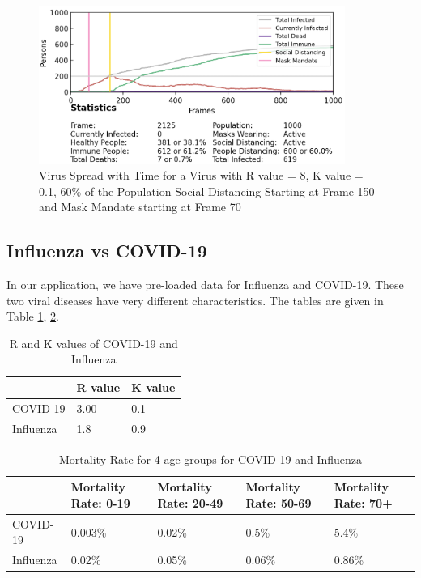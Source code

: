 \documentclass[11pt]{article}
\begin{document}
\begin{figure}[H]
    \centering
    \includegraphics[width=10cm]{figures/outbreak_control.png}
    \caption{Virus Spread with Time for a Virus with R value = 8, K value = 0.1, 60\% of the Population Social Distancing Starting at Frame 150 and Mask Mandate starting at Frame 70}
    \label{outbreak control}
\end{figure}

\subsection{Influenza vs COVID-19}
In our application, we have pre-loaded data for Influenza\cite{influ_ref}\cite{k_val} and COVID-19\cite{cov_ref}\cite{k_val}. These two viral diseases have very different characteristics. The tables are given in Table \ref{analysis-rk}, \ref{analysis-mortality}. 

\begin{table}[H]
\begin{tabular}{|l|l|l|}

\hline
          & R value & K value \\ \hline
COVID-19  & 3.00    & 0.1    \\ \hline
Influenza & 1.8     & 0.9    \\ \hline
\end{tabular}
    \caption{\label{analysis-rk}R and K values of COVID-19 and Influenza}
\end{table}

\begin{table}[H]
\begin{tabular}{|l|l|l|l|l|}

\hline
          & Mortality Rate: 0-19 & Mortality Rate: 20-49 & Mortality Rate: 50-69 & Mortality Rate: 70+ \\ \hline
COVID-19  & 0.003\%              & 0.02\%                & 0.5\%                 & 5.4\%               \\ \hline
Influenza & 0.02\%               & 0.05\%                & 0.06\%                & 0.86\%             \\ \hline
\end{tabular}
\caption{\label{analysis-mortality}Mortality Rate for 4 age groups for COVID-19 and Influenza}
\end{table}
\end{document}
